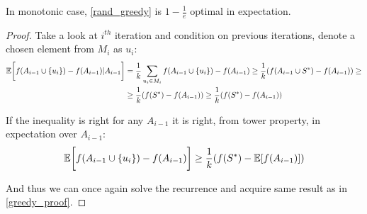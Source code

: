 \begin{theorem}
	In monotonic case, \cref{rand_greedy} is $1-\frac{1}{e}$ optimal in expectation.
	\begin{proof}
		Take a look at $i^{th}$ iteration and condition on previous iterations, denote a chosen element from $M_i$ as $u_i$:
		\begin{align}
		\mathbb{E} \qty\bigg[f(A_{i-1} \cup \qty{u_i}) - f(A_{i-1}) | A_{i-1} ] &= \frac{1}{k} \sum_{u_i \in M_i} f(A_{i-1} \cup \qty{u_i}) - f(A_{i-1}) \geq \frac{1}{k} \qty( f(A_{i-1} \cup S^*) - f(A_{i-1}) ) \geq\\&\geq \frac{1}{k} \qty( f(S^*) - f(A_{i-1}))\geq \frac{1}{k} \qty( f(S^*) - f(A_{i-1}))
		\end{align}
		
		If the inequality is right for any $A_{i-1}$ it is right, from tower property, in expectation over $A_{i-1}$:
		\begin{align}
		\mathbb{E} \qty\bigg[f(A_{i-1} \cup \qty{u_i}) - f(A_{i-1}) ] \geq 	\frac{1}{k} \qty( f(S^*) - \mathbb{E} \qty[ f(A_{i-1})] )
		\end{align}
		
		And thus we can once again solve the recurrence and acquire same result as in \vref{greedy_proof}.
	\end{proof}
\end{theorem}
